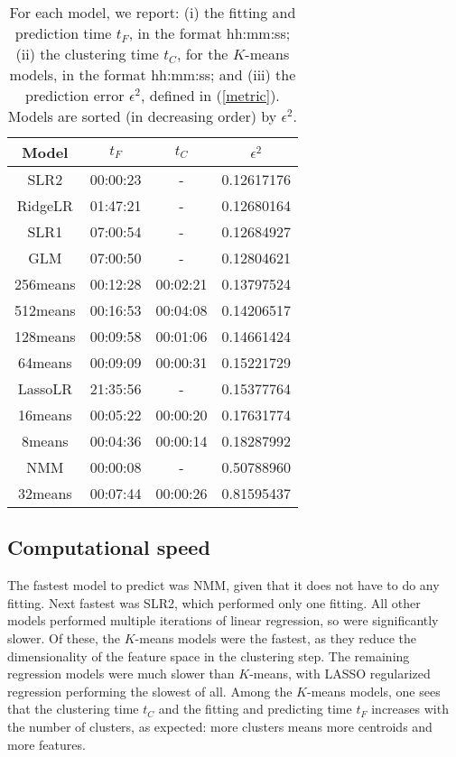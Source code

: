 \documentclass{article} %
\begin{document}
\begin{table}[htbp]
\small
   \centering
   \begin{tabular}{@{}|c|c|c|c|@{}} %
  \cline{1-4}
Model & $t_F$ & $t_C$ & $\epsilon^2$ \\ \hline
\hline
SLR2 & 00:00:23 & - & 0.12617176 \\ \hline
RidgeLR & 01:47:21 & - & 0.12680164 \\ \hline
SLR1 & 07:00:54 & - & 0.12684927 \\ \hline
GLM & 07:00:50 & - & 0.12804621 \\ \hline
256means & 00:12:28 & 00:02:21 & 0.13797524 \\ \hline
512means & 00:16:53 & 00:04:08 & 0.14206517 \\ \hline
128means & 00:09:58 & 00:01:06 & 0.14661424 \\ \hline
64means & 00:09:09 & 00:00:31 & 0.15221729 \\ \hline
LassoLR & 21:35:56 & - & 0.15377764 \\ \hline
16means & 00:05:22 & 00:00:20 & 0.17631774 \\ \hline
8means & 00:04:36 & 00:00:14 & 0.18287992 \\ \hline
NMM & 00:00:08 & - & 0.50788960 \\ \hline
32means & 00:07:44 & 00:00:26 & 0.81595437 \\ \hline
   \end{tabular}
   \caption{For each model, we report: (i) the fitting and prediction time $t_F$, in the format hh:mm:ss; (ii) the clustering time $t_C$, for the $K$-means models, in the format hh:mm:ss; and (iii) the prediction error $\epsilon^2$, defined in (\ref{metric}). Models are sorted (in decreasing order) by $\epsilon^2$.}
   \label{tab:models}
\end{table}

\subsection{Computational speed}

The fastest model to predict was NMM, given that it does not have to do any fitting. Next fastest was SLR2, which performed only one fitting. All other models performed multiple iterations of linear regression, so were significantly slower. Of these, the $K$-means models were the fastest, as they reduce the dimensionality of the feature space in the clustering step. The remaining regression models were much slower than $K$-means, with LASSO regularized regression performing the slowest of all. Among the $K$-means models, one sees that the clustering time $t_C$ and the fitting and predicting time $t_F$ increases with the number of clusters, as expected: more clusters means more centroids and more features.
\end{document}
